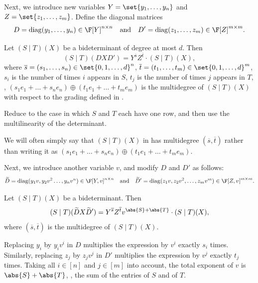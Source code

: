 \documentclass[letterpaper, 11pt]{amsart}
\begin{document}
Next, we introduce new variables $Y = \set{y_1,\dots,y_n}$ and $Z = \set{z_1,\dots,z_m}$.
Define the diagonal matrices 
\[
    D = \mathrm{diag}(y_1,\dots,y_n)\in\F[Y]^{n\times n} \quad\text{and}\quad D'=\mathrm{diag}(z_1,\dots,z_m)\in\F[Z]^{m\times m}.
\]

\begin{lem}\label{lem:diagonals}
Let $(S\mid T)(X)$ be a bideterminant of degree at most $d$.
Then 
\[
  (S\mid T)(D X D')=Y^{\overline{s}} Z^{\overline{t}}\cdot  (S\mid T)(X),
\]
where $\overline{s}=(s_1,\dots,s_n)\in \set{0,1,\dots,d}^n$, $\overline{t}=(t_1,\dots,t_m)\in \set{0,1,\dots,d}^m$, $s_i$ is the number of times $i$ appears in $S$, $t_j$ is the number of times $j$ appears in $T$, \ie, $(s_1 e_1+ \dots + s_n e_n)\oplus (t_1 e_1 + \dots + t_m e_m)$ is the multidegree of $(S\mid T)(X)$ with respect to the grading defined in .
\end{lem}
\begin{pf}
Reduce to the case in which $S$ and $T$ each have one row, and then use the multilinearity of the determinant.
\end{pf}
We will often simply say that $(S \mid T)(X)$ in  has multidegree $(\overline{s}, \overline{t})$ rather than writing it as $(s_1 e_1 + \dots + s_n e_n) \oplus (t_1 e_1 + \dots + t_m e_m)$.

Next, we introduce another variable $v$, and modify $D$ and $D'$ as follows:
\[
    \widetilde{D} = \mathrm{diag}(y_1 v, y_2 v^2\dots,y_n v^n )\in\F[Y,v]^{n\times n} \quad\text{and}\quad \widetilde{D}'=\mathrm{diag}(z_1 v,z_2 v^2,\dots,z_m v^m)\in\F[Z,v]^{m\times m}.
\]
\begin{lem}\label{lem:multiply-by-diag}
    Let $(S\mid T)(X)$ be a bideterminant.
    Then 
    \[
        (S\mid T)(\widetilde{D} X \widetilde{D}')=Y^{\overline{s}} Z^{\overline{t}} v^{\abs{S} + \abs{T}} \cdot (S\mid T)(X),
    \]
    where $(\overline{s},\overline{t})$ is the multidegree of $(S\mid T)(X)$.
\end{lem}

\begin{pf}
Replacing $y_i$ by $y_i v^i$ in $D$ multiplies the expression by $v^i$ exactly $s_i$ times.  
Similarly, replacing $z_j$ by $z_j v^j$ in $D'$ multiplies the expression by $v^j$ exactly $t_j$ times.  
Taking all $i \in [n]$ and $j \in [m]$ into account, the total exponent of $v$ is $\abs{S} + \abs{T}$, \ie, the sum of the entries of $S$ and of $T$.
\end{pf}
\end{document}
